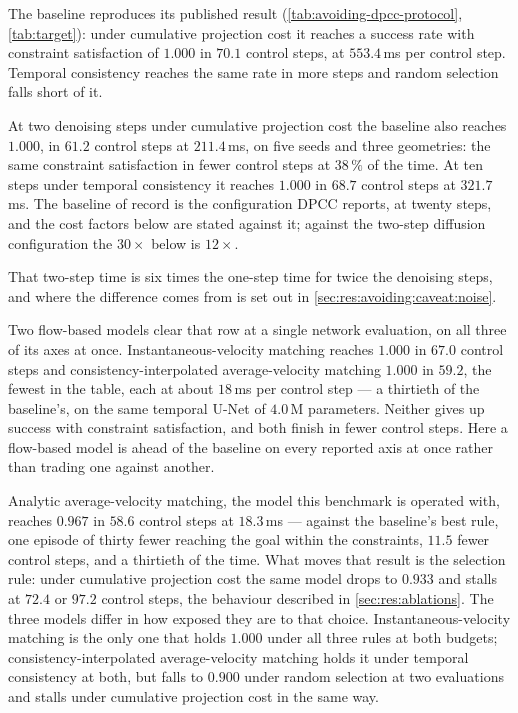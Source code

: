 The baseline reproduces its published result (\autoref{tab:avoiding-dpcc-protocol},
\autoref{tab:target}): under cumulative projection cost it reaches a success rate with constraint
satisfaction of $1.000$ in $70.1$ control steps, at $553.4$\,ms per control step. Temporal consistency
reaches the same rate in more steps and random selection falls short of it.

At two denoising steps under cumulative projection cost the baseline also reaches $1.000$, in $61.2$
control steps at $211.4$\,ms, on five seeds and three geometries: the same constraint satisfaction in
fewer control steps at $38\,\%$ of the time. At ten steps under temporal consistency it reaches $1.000$
in $68.7$ control steps at $321.7$\,ms. The baseline of record is
the configuration \ac{DPCC} reports, at twenty steps, and the cost factors below are stated against it;
against the two-step diffusion configuration the $30\times$ below is $12\times$.

That two-step time is six times the one-step time for twice the denoising steps, and where the
difference comes from is set out in \autoref{sec:res:avoiding:caveat:noise}.

Two flow-based models clear that row at a single network evaluation, on all three of its axes at once.
Instantaneous-velocity matching reaches $1.000$ in $67.0$ control steps and consistency-interpolated
average-velocity matching $1.000$ in $59.2$, the fewest in the table, each at about $18$\,ms per control
step --- a thirtieth of the baseline's, on the same temporal U-Net of $4.0$\,M parameters. Neither gives
up success with constraint satisfaction, and both finish in fewer control steps. Here a flow-based model
is ahead of the baseline on every reported axis at once rather than trading one against another.

Analytic average-velocity matching, the model this benchmark is operated with, reaches $0.967$ in $58.6$
control steps at $18.3$\,ms --- against the baseline's best rule, one episode of thirty fewer reaching
the goal within the constraints, $11.5$ fewer control steps, and a thirtieth of the time. What moves that
result is the selection rule: under cumulative projection cost the same model drops to $0.933$ and stalls
at $72.4$ or $97.2$ control steps, the
behaviour described in \autoref{sec:res:ablations}. The three models differ in how exposed they are to
that choice. Instantaneous-velocity matching is the only one that holds $1.000$ under all three rules at
both budgets; consistency-interpolated average-velocity matching holds it under temporal consistency at
both, but falls to $0.900$ under random selection at two evaluations and stalls under cumulative
projection cost in the same way.

